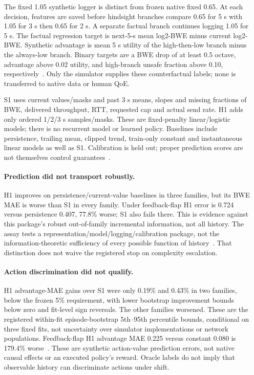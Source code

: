 \documentclass[10pt]{article}
\begin{document}
The fixed 1.05 synthetic logger is distinct from frozen native fixed 0.65.
At each decision, features are saved before hindsight branches compare 0.65 for
5 s with 1.05 for 3 s then 0.65 for 2 s. A separate factual branch continues
logging 1.05 for 5 s. The factual regression target is next-5-s mean log2-BWE
minus current log2-BWE. Synthetic advantage is mean 5 s utility of the
high-then-low branch minus the always-low branch. Binary targets are a BWE drop
of at least 0.5 octave, advantage above 0.02 utility, and high-branch unsafe
fraction above 0.10, respectively~\cite{po1}. Only the simulator supplies these
counterfactual labels; none is transferred to native data or human QoE.

S1 uses current values/masks and past 3 s means, slopes and missing fractions of
BWE, delivered throughput, RTT, requested cap and actual send rate. H1 adds only
ordered 1/2/3 s samples/masks. These are fixed-penalty linear/logistic models;
there is no recurrent model or learned policy. Baselines include persistence,
trailing mean, clipped trend, train-only constant and instantaneous linear
models as well as S1. Calibration is held out; proper prediction scores are not
themselves control guarantees~\cite{scoring,ovadia,po1}.

\POOneTable

\paragraph{Prediction did not transport robustly.}
H1 improves on persistence/current-value baselines in three families, but its BWE
MAE is worse than S1 in every family. Under feedback-flap H1 error is 0.724 versus
persistence 0.407, 77.8\% worse; S1 also fails there. This is evidence against this
package's robust out-of-family incremental information, not all history.
The assay tests a representation/model/logging/calibration package, not the
information-theoretic sufficiency of every possible function of history~\cite{po1}.
That distinction does not waive the registered stop on complexity escalation.

\paragraph{Action discrimination did not qualify.}
H1 advantage-MAE gains over S1 were only 0.19\% and 0.43\% in two families, below
the frozen 5\% requirement, with lower bootstrap improvement bounds below zero
and fit-level sign reversals. The other families worsened. These are the
registered within-fit episode-bootstrap 5th--95th percentile bounds, conditional
on three fixed fits, not uncertainty over simulator implementations or network
populations. Feedback-flap H1 advantage MAE 0.225 versus constant 0.080 is 179.4\%
worse~\cite{po1}. These are synthetic action-value prediction errors, not native
causal effects or an executed policy's reward. Oracle labels do not imply that
observable history can discriminate actions under shift.
\end{document}
